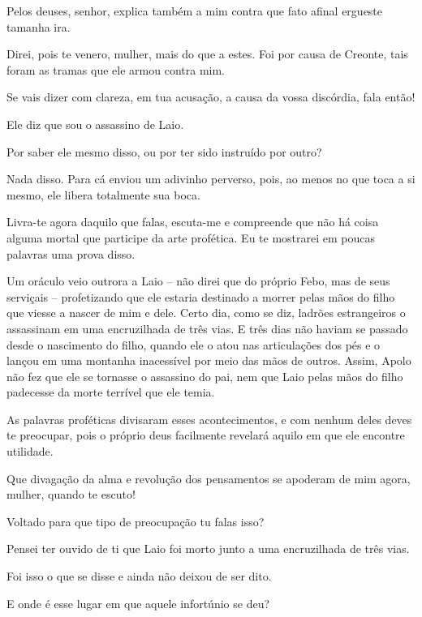    Pelos deuses, senhor, explica também a mim contra que fato afinal
ergueste tamanha ira.

    Direi, pois te venero, mulher, mais do que a estes. Foi por causa
de Creonte, tais foram as tramas que ele armou contra mim.

   Se vais dizer com clareza, em tua acusação, a causa da vossa discórdia,
fala então!

   Ele diz que sou o assassino de Laio.

   Por saber ele mesmo disso, ou por ter sido instruído por outro?

   Nada disso. Para cá enviou um adivinho perverso, pois, ao menos no que
toca a si mesmo, ele libera totalmente sua boca.

   Livra-te agora daquilo que falas, escuta-me e compreende que não há
coisa alguma mortal que participe da arte profética. Eu te
mostrarei em poucas palavras uma prova disso.

Um oráculo veio outrora a Laio -- não direi que do próprio Febo, mas de
seus serviçais -- profetizando que ele estaria destinado a morrer pelas
mãos do filho que viesse a nascer de mim e dele. Certo dia, como se diz,
ladrões estrangeiros o assassinam em uma encruzilhada de três vias. E
três dias não haviam se passado desde o nascimento do filho, quando ele
o atou nas articulações dos pés e o lançou em uma montanha
inacessível por meio das mãos de outros. Assim, Apolo não fez que ele se
tornasse o assassino do pai, nem que Laio pelas mãos do filho padecesse
da morte terrível que ele temia.

As palavras proféticas divisaram esses acontecimentos, e com nenhum
deles deves te preocupar, pois o próprio deus facilmente revelará aquilo
em que ele encontre utilidade.

   Que divagação da alma e revolução dos pensamentos se apoderam de mim
agora, mulher, quando te escuto!

   Voltado para que tipo de preocupação tu falas isso?

  Pensei ter ouvido de ti que Laio foi morto junto a uma
encruzilhada de três vias.

   Foi isso o que se disse e ainda não deixou de ser dito.

   E onde é esse lugar em que aquele infortúnio se deu?

